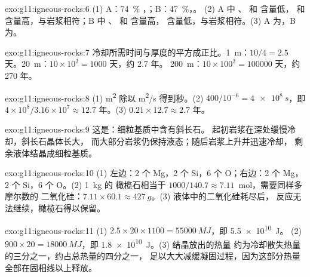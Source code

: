 \begin{solution}{exo:g11:igneous-rocks:6}
(1) A：\qty{74}{\percent} ，；B：\qty{47}{\percent}，。
(2) A 中 、 和  含量低， 和
 含量高，与岩浆相符；B 中 、 和  含量高，
 含量低，与岩浆相符。(3) A 为，B 为。
\end{solution}

\begin{solution}{exo:g11:igneous-rocks:7}
冷却所需时间与厚度的平方成正比。\qty{1}{m}：$10/4 = 2.5$
天。\qty{20}{m}：$10 \times 10^2 = 1000$ 天，约 2.7 年。
\qty{200}{m}：$10 \times 100^2 = \num{100000}$ 天，约 270 年。
\end{solution}

\begin{solution}{exo:g11:igneous-rocks:8}
(1) \unit{m^2} 除以 \unit{m^2/s} 得到秒。(2) $400/10^{-6} =
\qty{4e8}{s}$，即 $4 \times 10^8 / 3.16 \times 10^7 \approx 12.7$
年。(3) $0.21 \times 12.7 \approx 2.7$ 年。
\end{solution}

\begin{solution}{exo:g11:igneous-rocks:9}
这是：细粒基质中含有斜长石。
起初岩浆在深处缓慢冷却，斜长石晶体长大，
而大部分岩浆仍保持液态；随后岩浆上升并迅速冷却，
剩余液体结晶成细粒基质。
\end{solution}

\begin{solution}{exo:g11:igneous-rocks:10}
(1) 左边：2 个 Mg，2 个 Si，6 个 O；右边：2 个 Mg，2 个 Si，6 个 O。(2) \qty{1}{kg} 的
橄榄石相当于 $1000/140.7 \approx 7.11$~mol，需要同样多摩尔数的
二氧化硅：$7.11 \times 60.1 \approx \qty{427}{g}$。(3) 液体中的二氧化硅耗尽后，
反应无法继续，橄榄石得以保留。
\end{solution}

\begin{solution}{exo:g11:igneous-rocks:11}
(1) $2.5 \times 20 \times 1100 = \qty{55000}{MJ}$，即 \qty{5.5e10}{J}。
(2) $900 \times 20 = \qty{18000}{MJ}$，即 \qty{1.8e10}{J}。(3) 结晶放出的热量
约为冷却散失热量的三分之一，约占总热量的四分之一，
足以大大减缓凝固过程，因为这部分热量
全部在固相线以上释放。
\end{solution}

